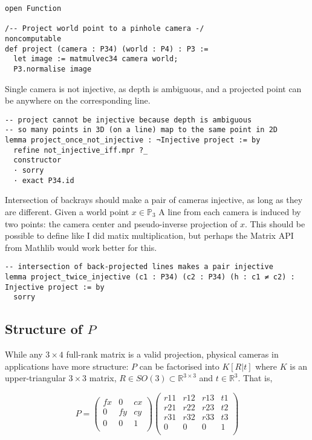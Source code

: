 \documentclass[a4paper, 12pt]{article}
\newcommand{\R}{\mathbb{R}}
\renewcommand{\P}{\mathbb{P}}
\begin{document}
\begin{lstlisting}
open Function

/-- Project world point to a pinhole camera -/
noncomputable
def project (camera : P34) (world : P4) : P3 :=
  let image := matmulvec34 camera world;
  P3.normalise image
\end{lstlisting}

Single camera is not injective,
as depth is ambiguous,
and a projected point
can be anywhere on the corresponding line.

\begin{lstlisting}
-- project cannot be injective because depth is ambiguous
-- so many points in 3D (on a line) map to the same point in 2D
lemma project_once_not_injective : ¬Injective project := by
  refine not_injective_iff.mpr ?_
  constructor
  · sorry
  · exact P34.id
\end{lstlisting}

Intersection of backrays should make a pair of cameras injective,
as long as they are different.
Given a world point $x\in \P_3$
A line from each camera is induced by two points:
the camera center and pseudo-inverse projection of $x$.
This should be possible to define like I did matix multiplication,
but perhaps the Matrix API from Mathlib would work better for this.

\begin{lstlisting}
-- intersection of back-projected lines makes a pair injective
lemma project_twice_injective (c1 : P34) (c2 : P34) (h : c1 ≠ c2) : Injective project := by
  sorry
\end{lstlisting}

\subsection*{Structure of $P$}

While any $3\times 4$ full-rank matrix is a valid projection,
physical cameras in applications have more structure:
$P$ can be factorised into $K[R|t]$
where $K$ is an upper-triangular $3\times 3$ matrix,
$R\in SO(3)\subset \R^{3\times 3}$ and $t\in \R^3$.
That is,

$$
P=
\begin{pmatrix}
  fx & 0 & cx \\
  0 & fy & cy \\
  0 & 0 & 1 \\
\end{pmatrix}
\begin{pmatrix}
  r11 & r12 & r13 & t1 \\
  r21 & r22 & r23 & t2 \\
  r31 & r32 & r33 & t3 \\
  0 & 0 & 0 & 1 \\
\end{pmatrix}
$$
\end{document}
